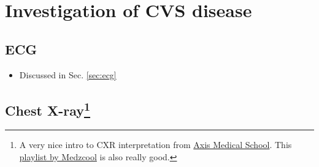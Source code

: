 \documentclass[
  12pt,
]{memoir}
\providecommand{\tightlist}{%
  \setlength{\itemsep}{0pt}\setlength{\parskip}{0pt}}
\begin{document}
\hypertarget{investigation-of-cvs-disease}{%
\section{Investigation of CVS
disease}\label{investigation-of-cvs-disease}}

\hypertarget{ecg}{%
\subsection{ECG}\label{ecg}}

\begin{itemize}
\tightlist
\item
  Discussed in Sec. \ref{sec:ecg}
\end{itemize}

\subsection[CXR]{Chest X-ray\footnote{A very nice intro to CXR
 interpretation from \href{https://youtu.be/KO1eBNaIxBI}{Axis Medical
 School}. This \href{https://youtube.com/playlist?list=PL3n8cHP87ijCCF4J27hHEKKrvub0yVBPa}
 {playlist by Medzcool} is also really good.}}
\end{document}
